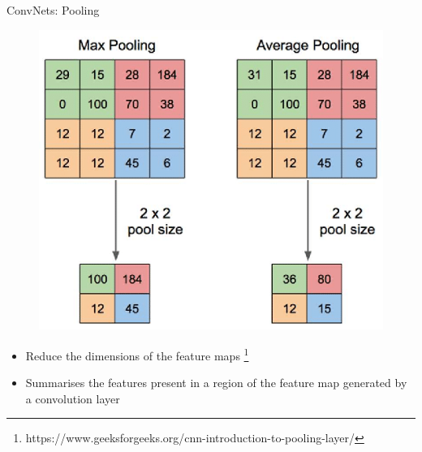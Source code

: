\documentclass{beamer}
\begin{document}
\begin{frame}{ConvNets: Pooling}

\begin{figure}
    \centering
    \includegraphics[scale=0.3]{images/Pooling methods.png}
\end{figure}

\begin{itemize}
    \item Reduce the dimensions of the feature maps \footnote{\label{ref1}https://www.geeksforgeeks.org/cnn-introduction-to-pooling-layer/}
    \item Summarises the features present in a region of the feature map generated by a convolution layer \footnotemark[1]
\end{itemize}
\end{frame}
\end{document}
